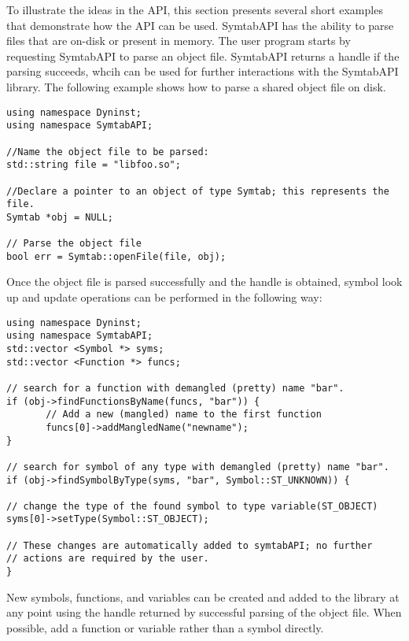 To illustrate the ideas in the API, this section presents several short examples
that demonstrate how the API can be used.  SymtabAPI has the ability to parse
files that are on-disk or present in memory. The user program starts by
requesting SymtabAPI to parse an object file. SymtabAPI returns a handle if the
parsing succeeds, whcih can be used for further interactions with the SymtabAPI
library. The following example shows how to parse a shared object file on disk.

\lstset{numbers=left, numberstyle=\tiny, stepnumber=5, numbersep=5pt}
\begin{lstlisting}
using namespace Dyninst;
using namespace SymtabAPI;

//Name the object file to be parsed:
std::string file = "libfoo.so";

//Declare a pointer to an object of type Symtab; this represents the file.
Symtab *obj = NULL;

// Parse the object file
bool err = Symtab::openFile(file, obj);
\end{lstlisting}

Once the object file is parsed successfully and the handle is obtained, symbol look up and update operations can be performed in the following way:

\begin{lstlisting}
using namespace Dyninst;
using namespace SymtabAPI;
std::vector <Symbol *> syms;
std::vector <Function *> funcs;

// search for a function with demangled (pretty) name "bar".
if (obj->findFunctionsByName(funcs, "bar")) {
       // Add a new (mangled) name to the first function
       funcs[0]->addMangledName("newname");
}

// search for symbol of any type with demangled (pretty) name "bar".
if (obj->findSymbolByType(syms, "bar", Symbol::ST_UNKNOWN)) {

// change the type of the found symbol to type variable(ST_OBJECT)
syms[0]->setType(Symbol::ST_OBJECT);

// These changes are automatically added to symtabAPI; no further
// actions are required by the user.
}
\end{lstlisting}

New symbols, functions, and variables can be created and added to the library at any point using the handle returned by successful parsing of the object file. When possible, add a function or variable rather than a symbol directly. 

